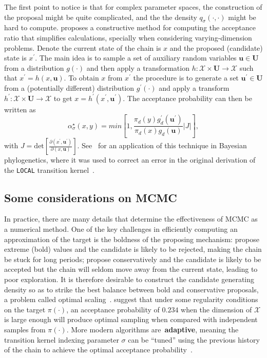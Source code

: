 The first point to notice is that for complex parameter spaces, the construction of the proposal might be quite complicated, and the the density  $q_\sigma(\cdot, \cdot)$ might be hard to compute.
\citep{Green2003} proposes a constructive method for computing the acceptance ratio that simplifies calculations, specially when considering varying-dimension problems.
Denote the current state of the chain is $x$ and the proposed (candidate) state is $x^\prime$.
The main idea is to sample a set of auxiliary random variables $\boldsymbol u \in \boldsymbol U$ from a distribution $g(\cdot)$ and then apply a transformation $h : \mathcal{X} \times \boldsymbol U \to \mathcal{X} $ such that $x^\prime = h(x, \boldsymbol u)$.
To obtain $x$ from $x^\prime$ the procedure is to generate a set $\boldsymbol u^\prime \in \boldsymbol U$ from a (potentially different) distribution $g^\prime(\cdot)$ and apply a transform $h^\prime : \mathcal{X} \times \boldsymbol U \to \mathcal{X}$ to get $x = h^\prime(x^\prime, \boldsymbol u^\prime)$.
The acceptance probability can then be written as 
\[
 \alpha^\star_\sigma(x, y) = min \left[1, \frac{\pi_d(y) g_d^\prime(\boldsymbol u^\prime)}{\pi_d(x) g_d(\boldsymbol u)} |J| \right],
\]
with $J = \text{det} \left[\frac{\partial (x^\prime, \boldsymbol u^\prime) }{\partial (x, \boldsymbol u)} \right]$.
See~\cite{Holder2005} for an application of this technique in Bayesian phylogenetics, where it was used to correct an error in the original derivation of the \verb|LOCAL| transition kernel~\citep{Larget1999}.


\subsection{Some considerations on MCMC}
\label{sec:practical}

In practice, there are many details that determine the effectiveness of MCMC as a numerical method.
One of the key challenges in efficiently computing an approximation of the target is the boldness of the proposing mechanism: propose extreme (bold) values and the candidate is likely to be rejected, making the chain be stuck for long periods; propose conservatively and the candidate is likely to be accepted but the chain will seldom move away from the current state, leading to poor exploration.
It is therefore desirable to construct the candidate generating density so as to strike the best balance between bold and conservative proposals, a problem called optimal scaling~\citep{Roberts1998,Roberts2001}.
\cite{Gelman1996} suggest that under some regularity conditions on the target $\pi(\cdot)$, an acceptance probability of $0.234$ when the dimension of $\mathcal{X}$ is large enough will produce optimal sampling when compared with independent samples from $\pi(\cdot)$. 
More modern algorithms are~\textbf{adaptive}, meaning the transition kernel indexing parameter $\sigma$ can be ``tuned'' using the previous history of the chain to achieve the optimal acceptance probability~\citep{Haario2001}.

